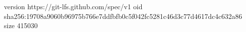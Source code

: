 version https://git-lfs.github.com/spec/v1
oid sha256:19708a9060b96975b766e7ddfbfb0c5f042fc5281c46d3c77d4617dc4c632a86
size 415030
